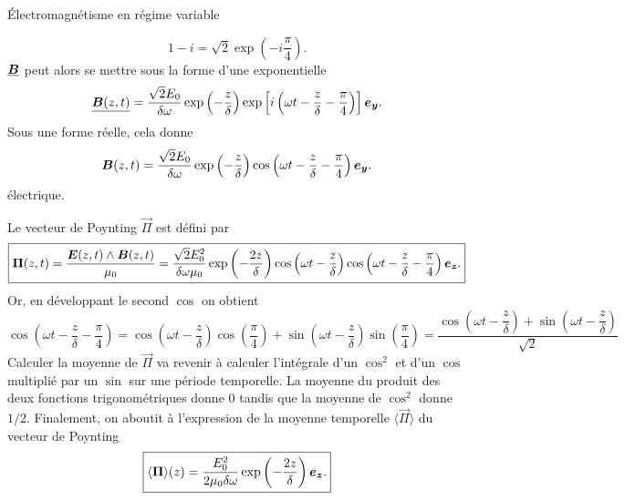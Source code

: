 \begin{corr}{Électromagnétisme en régime variable}
\begin{corrlist}
\begin{equation*}
		      1 - i = \sqrt{2} \exp\left(-i\dfrac{\pi}{4}\right).
	      \end{equation*}
	      $\complex{\vecb}$ peut alors se mettre sous la forme d'une exponentielle
	      \begin{equation*}
		      \complex{\vecb(z, t)} = \dfrac{\sqrt{2}E_0}{\delta \omega}
		      \exp\left(- \dfrac{z}{\delta}\right)
		      \exp\left[i\left(\omega t - \dfrac{z}{\delta} - \dfrac{\pi}{4}
		      \right)\right] \ey.
	      \end{equation*}
	      Sous une forme réelle, cela donne
	      \begin{equation*}
		      \vecb(z, t) = \dfrac{\sqrt{2}E_0}{\delta \omega}
		      \exp\left(- \dfrac{z}{\delta}\right)
		      \cos\left(\omega t - \dfrac{z}{\delta} - \dfrac{\pi}{4}
		      \right) \ey.
	      \end{equation*}
	      électrique.
      \item Le vecteur de Poynting $\vec{\Pi}$ est défini par 
	    \begin{equation*}
		    \boxed{
			    \vec{\Pi}(z, t) = \dfrac{\vece(z,t) \wedge 
			    \vecb(z, t)}{\mu_0}
		            = \dfrac{\sqrt{2} E_0^2}{\delta \omega \mu_0}
			    \exp\left(-\dfrac{2z}{\delta}\right)
			      \cos\left(\omega t - \dfrac{z}{\delta}\right)
			      \cos\left(\omega t - \dfrac{z}{\delta} 
			      - \dfrac{\pi}{4} \right) \ez.
			  }
	   \end{equation*}
	   Or, en développant le second $\cos$ on obtient
	   \begin{equation*}
		   \cos\left(\omega t - \dfrac{z}{\delta} - \dfrac{\pi}{4}\right) = 
			\cos\left(\omega t - \dfrac{z}{\delta}\right) 
			\cos\left(\dfrac{\pi}{4}\right) + 
			\sin\left(\omega t - \dfrac{z}{\delta}\right) 
			\sin\left(\dfrac{\pi}{4}\right) =
			\dfrac{\cos\left(\omega t - \dfrac{z}{\delta}\right)
			+ \sin\left(\omega t - \dfrac{z}{\delta}\right)}
			{\sqrt{2}}
	   \end{equation*}
	   Calculer la moyenne de $\vec{\Pi}$ va revenir à calculer l'intégrale
	   d'un $\cos^2$ et d'un $\cos$ multiplié par un $\sin$ sur une
	   période temporelle. La moyenne du produit des deux fonctions trigonométriques
	   donne $0$ tandis que la moyenne de $\cos^2$ donne $1/2$. Finalement, 
	   on aboutit à l'expression de la moyenne temporelle $\langle \vec{\Pi} \rangle$
	   du vecteur de Poynting
	   \begin{equation*}
		   \boxed{
			   \langle \vec{\Pi} \rangle(z) = \dfrac{E_0^2}{2 
			   \mu_0 \delta \omega}
		   	   \exp\left(-\dfrac{2z}{\delta}\right) \ez .
}
\end{equation*}
\end{corrlist}
\end{corr}
